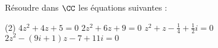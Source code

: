 %
%
	Résoudre dans $\CC$ les équations suivantes :
	\begin{tasks}(2)
		\task $4z^2 + 4z + 5 = 0$
		\task $2z^2 + 6z + 9= 0$
		\task $z^2 + z - \frac{1}{4} +\frac{1}{2}i = 0$
		\task $2z^2-(9i+1)z-7+11i=0$
	\end{tasks}
